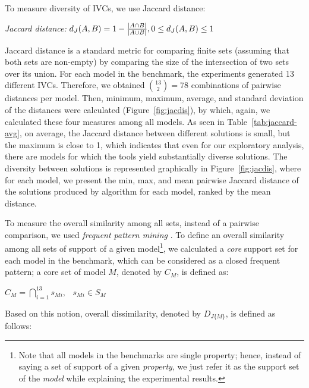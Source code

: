 To measure diversity of IVCs, we use Jaccard distance:
\begin{definition}{\emph{Jaccard distance:}}
  \label{def:dj}
  $d_J(\small{A}, \small{B}) = 1 - \frac{|A \cap B|}{|A \cup B|} ,\\ 0 \leq d_J(\small{A}, \small{B}) \leq 1$
\end{definition}
\noindent Jaccard distance is a standard metric for comparing finite
sets (assuming that both sets are non-empty) by comparing the size of
the intersection of two sets over its union. For each model in the
benchmark, the experiments generated 13 different IVCs. Therefore, we
obtained $\binom{13}{2} = 78$ combinations of pairwise distances per
model. Then, minimum, maximum, average, and standard deviation of the
distances were calculated (Figure~\ref{fig:jacdis}), by which, again,
we calculated these four measures among all models. As seen in
Table~\ref{tab:jaccard-avg}, on average, the Jaccard distance between
different solutions is small, but the maximum is close to 1, which
indicates that even for our exploratory analysis, there are models for
which the tools yield substantially diverse solutions. The diversity
between solutions is represented graphically in
Figure~\ref{fig:jacdis}, where for each model, we present the min,
max, and mean pairwise Jaccard distance of the solutions produced by algorithm
\ucalg for each model, ranked by the mean distance.

\iffalse
{}

To measure the overall similarity among all sets, instead of a pairwise comparison, we used \emph{frequent pattern mining} \cite{han2007frequent}. To define an overall similarity among all sets of support of a given model\footnote{Note that all models in the benchmarks are single property; hence, instead of saying a set of support of a given \emph{property}, we just refer it as the support set of the \emph{model} while explaining the experimental results.}, we calculated a \emph{core} support set for each model in the benchmark, which can be considered as a closed frequent pattern; a core set of model $M$, denoted by $C_M$, is defined as:
\begin{definition}
  \label{def:core}
  $C_M = \bigcap_{i=1}^{13} s_{Mi},   \hspace{9pt} s_{Mi} \in S_M$
\end{definition}

Based on this notion, overall dissimilarity, denoted by $D_{J\{M\}}$, is defined as follows:

